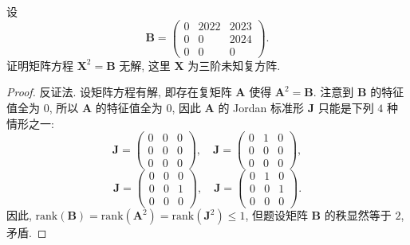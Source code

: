 \documentclass[../../main.tex]{subfiles}%
\begin{document}
\begin{example}
设
\[
\boldsymbol{B} = \begin{pmatrix} 0 & 2022 & 2023 \\ 0 & 0 & 2024 \\ 0 & 0 & 0 \end{pmatrix}.
\]
证明矩阵方程 \( \boldsymbol{X}^2 = \boldsymbol{B} \) 无解, 这里 \( \boldsymbol{X} \) 为三阶未知复方阵.
\end{example}
\begin{proof}
反证法. 设矩阵方程有解, 即存在复矩阵 \( \boldsymbol{A} \) 使得 \( \boldsymbol{A}^2 = \boldsymbol{B} \). 注意到 \( \boldsymbol{B} \) 的特征值全为 \( 0 \), 所以 \( \boldsymbol{A} \) 的特征值全为 \( 0 \), 因此 \( \boldsymbol{A} \) 的 Jordan 标准形 \( \boldsymbol{J} \) 只能是下列 \( 4 \) 种情形之一:
\[
\boldsymbol{J} = \begin{pmatrix} 0 & 0 & 0 \\ 0 & 0 & 0 \\ 0 & 0 & 0 \end{pmatrix}, \quad \boldsymbol{J} = \begin{pmatrix} 0 & 1 & 0 \\ 0 & 0 & 0 \\ 0 & 0 & 0 \end{pmatrix},
\]
\[
\boldsymbol{J} = \begin{pmatrix} 0 & 0 & 0 \\ 0 & 0 & 1 \\ 0 & 0 & 0 \end{pmatrix}, \quad \boldsymbol{J} = \begin{pmatrix} 0 & 1 & 0 \\ 0 & 0 & 1 \\ 0 & 0 & 0 \end{pmatrix}.
\]
因此, \( \mathrm{rank}(\boldsymbol{B}) = \mathrm{rank}(\boldsymbol{A}^2) = \mathrm{rank}(\boldsymbol{J}^2) \leqslant 1 \), 但题设矩阵 \( \boldsymbol{B} \) 的秩显然等于 \( 2 \), 矛盾.
\end{proof}
\end{document}
